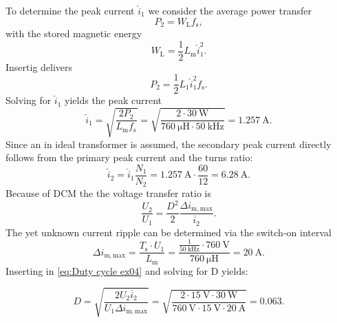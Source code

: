 \begin{solutionblock}
To determine the peak current  $\hat i_\mathrm{1}$ we consider the average power transfer
\begin{equation}
    P_\mathrm{2} = W_\mathrm{L} f_\mathrm{s}, \label{eq:output power ex04}
\end{equation}
with the stored magnetic energy
\begin{equation}
    W_\mathrm{L} = \frac{1}{2}L_\mathrm{m}\hat i_\mathrm{1}^2. \label{eq:energy primary inductance ex04}
\end{equation}
Insertig delivers
\begin{equation}
    P_\mathrm{2} = \frac{1}{2}L_\mathrm{1}\hat i_\mathrm{1}^2 f_\mathrm{s}.\label{eq:output power with IDach ex04}
\end{equation}
Solving for $\hat i_\mathrm{1}$ yields the peak current
\begin{equation}
    \hat i_\mathrm{1} = \sqrt{\frac{2P_\mathrm{2}}{L_\mathrm{m}f_\mathrm{s}}}= \sqrt{\frac{2\cdot\SI{30}{\watt}}{\SI{760}{\micro\henry}\cdot\SI{50}{\kilo\hertz}}}=\SI{1.257}{\ampere}.
\end{equation}
Since an in ideal transformer is assumed, the secondary peak current directly follows from the primary peak current and the turns ratio:
\begin{equation}
    \hat i_\mathrm{2} = \hat i_\mathrm{1} \frac{N_\mathrm{1}}{N_\mathrm{2}} = \SI{1.257}{\ampere} \cdot \frac{60}{12} = \SI{6.28}{\ampere}.
\end{equation}
Because of DCM the the voltage transfer ratio is
\begin{equation}
    \frac{U_2}{U_1} = \frac{D^2}{2} \frac{\Delta i_\mathrm{m,max}}{\overline{i}_2}. \label{eq:Duty cycle ex04}
\end{equation}
The yet unknown current ripple can be determined via the switch-on interval
\begin{equation}
    \Delta i_\mathrm{m,max}= \frac{T_\mathrm{s} \cdot U_1}{L_\mathrm{m}} = \frac{\frac{1}{\SI{50}{\kilo\hertz}}\cdot \SI{760}{\volt}}{\SI{760}{\micro\henry}}=\SI{20}{\ampere}.
\end{equation}
Inserting in \eqref{eq:Duty cycle ex04} and solving for D yields:

\begin{equation}
    D = \sqrt{\frac{2U_2\overline{i}_2}{U_1\Delta i_\mathrm{m,max}}} = \sqrt{\frac{2\cdot \SI{15}{\volt}\cdot\SI{30}{\watt}}{\SI{760}{\volt}\cdot\SI{15}{\volt}\cdot\SI{20}{\ampere}}} = 0.063.
\end{equation}

\end{solutionblock}

